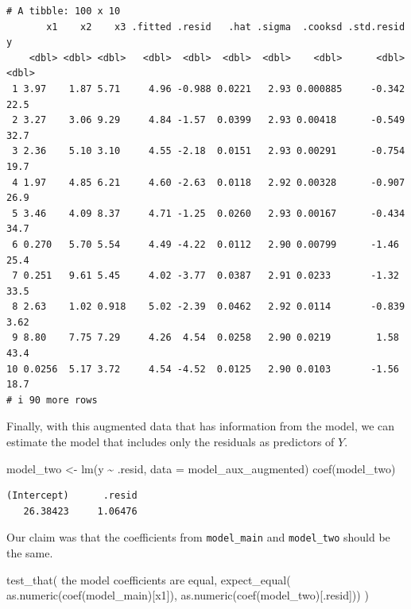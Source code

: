 \documentclass[
  letterpaper,
  DIV=11,
  numbers=noendperiod]{scrreprt}
\newenvironment{Shaded}{\begin{snugshade}}{\end{snugshade}}
\newcommand{\AttributeTok}[1]{\textcolor[rgb]{0.40,0.45,0.13}{#1}}
\newcommand{\FunctionTok}[1]{\textcolor[rgb]{0.28,0.35,0.67}{#1}}
\newcommand{\NormalTok}[1]{\textcolor[rgb]{0.00,0.23,0.31}{#1}}
\newcommand{\OtherTok}[1]{\textcolor[rgb]{0.00,0.23,0.31}{#1}}
\newcommand{\SpecialCharTok}[1]{\textcolor[rgb]{0.37,0.37,0.37}{#1}}
\newcommand{\StringTok}[1]{\textcolor[rgb]{0.13,0.47,0.30}{#1}}
\begin{document}
\begin{verbatim}
# A tibble: 100 x 10
       x1    x2    x3 .fitted .resid   .hat .sigma  .cooksd .std.resid     y
    <dbl> <dbl> <dbl>   <dbl>  <dbl>  <dbl>  <dbl>    <dbl>      <dbl> <dbl>
 1 3.97    1.87 5.71     4.96 -0.988 0.0221   2.93 0.000885     -0.342 22.5 
 2 3.27    3.06 9.29     4.84 -1.57  0.0399   2.93 0.00418      -0.549 32.7 
 3 2.36    5.10 3.10     4.55 -2.18  0.0151   2.93 0.00291      -0.754 19.7 
 4 1.97    4.85 6.21     4.60 -2.63  0.0118   2.92 0.00328      -0.907 26.9 
 5 3.46    4.09 8.37     4.71 -1.25  0.0260   2.93 0.00167      -0.434 34.7 
 6 0.270   5.70 5.54     4.49 -4.22  0.0112   2.90 0.00799      -1.46  25.4 
 7 0.251   9.61 5.45     4.02 -3.77  0.0387   2.91 0.0233       -1.32  33.5 
 8 2.63    1.02 0.918    5.02 -2.39  0.0462   2.92 0.0114       -0.839  3.62
 9 8.80    7.75 7.29     4.26  4.54  0.0258   2.90 0.0219        1.58  43.4 
10 0.0256  5.17 3.72     4.54 -4.52  0.0125   2.90 0.0103       -1.56  18.7 
# i 90 more rows
\end{verbatim}

Finally, with this augmented data that has information from the model,
we can estimate the model that includes only the residuals as predictors
of \(Y\).

\begin{Shaded}
\begin{Highlighting}[]
\NormalTok{model\_two }\OtherTok{\textless{}{-}} \FunctionTok{lm}\NormalTok{(y }\SpecialCharTok{\textasciitilde{}}\NormalTok{ .resid, }\AttributeTok{data =}\NormalTok{ model\_aux\_augmented)}
\FunctionTok{coef}\NormalTok{(model\_two)}
\end{Highlighting}
\end{Shaded}

\begin{verbatim}
(Intercept)      .resid 
   26.38423     1.06476 
\end{verbatim}

Our claim was that the coefficients from \texttt{model\_main} and
\texttt{model\_two} should be the same.

\begin{Shaded}
\begin{Highlighting}[]
\FunctionTok{test\_that}\NormalTok{(}
  \StringTok{\textquotesingle{}the model coefficients are equal\textquotesingle{}}\NormalTok{, }
  \FunctionTok{expect\_equal}\NormalTok{(}
    \FunctionTok{as.numeric}\NormalTok{(}\FunctionTok{coef}\NormalTok{(model\_main)[}\StringTok{\textquotesingle{}x1\textquotesingle{}}\NormalTok{]), }
    \FunctionTok{as.numeric}\NormalTok{(}\FunctionTok{coef}\NormalTok{(model\_two)[}\StringTok{\textquotesingle{}.resid\textquotesingle{}}\NormalTok{]))}
\NormalTok{)}
\end{Highlighting}
\end{Shaded}
\end{document}
